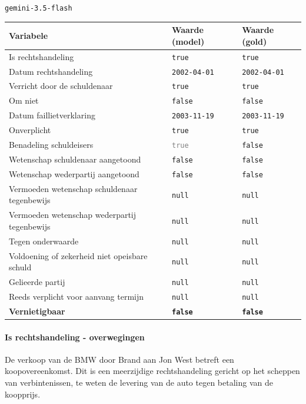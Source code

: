 \documentclass[
  dutch,
  a4paper,
]{article}
\begin{document}
\texttt{gemini-3.5-flash}

\begin{center}
\small
\begin{tabular}{@{}p{7.4cm}p{2.6cm}p{2.6cm}@{}}
\toprule
Variabele & Waarde (model) & Waarde (gold) \\
\midrule
Is rechtshandeling & \texttt{true} & \texttt{true} \\
Datum rechtshandeling & \texttt{2002-04-01} & \texttt{2002-04-01} \\
Verricht door de schuldenaar & \texttt{true} & \texttt{true} \\
Om niet & \texttt{false} & \texttt{false} \\
Datum faillietverklaring & \texttt{2003-11-19} & \texttt{2003-11-19} \\
Onverplicht & \texttt{true} & \texttt{true} \\
Benadeling schuldeisers & \textcolor{gray}{\texttt{true}} & \texttt{false} \\
Wetenschap schuldenaar aangetoond & \texttt{false} & \texttt{false} \\
Wetenschap wederpartij aangetoond & \texttt{false} & \texttt{false} \\
Vermoeden wetenschap schuldenaar tegenbewijs & \texttt{null} & \texttt{null} \\
Vermoeden wetenschap wederpartij tegenbewijs & \texttt{null} & \texttt{null} \\
Tegen onderwaarde & \texttt{null} & \texttt{null} \\
Voldoening of zekerheid niet opeisbare schuld & \texttt{null} & \texttt{null} \\
Gelieerde partij & \texttt{null} & \texttt{null} \\
Reeds verplicht voor aanvang termijn & \texttt{null} & \texttt{null} \\
\textbf{Vernietigbaar} & \textbf{\texttt{false}} & \textbf{\texttt{false}} \\
\bottomrule
\end{tabular}
\end{center}

\paragraph{Is rechtshandeling - overwegingen}\label{is-rechtshandeling---overwegingen-59}

De verkoop van de BMW door Brand aan Jon West betreft een koopovereenkomst. Dit is een meerzijdige rechtshandeling gericht op het scheppen van verbintenissen, te weten de levering van de auto tegen betaling van de koopprijs.
\end{document}
